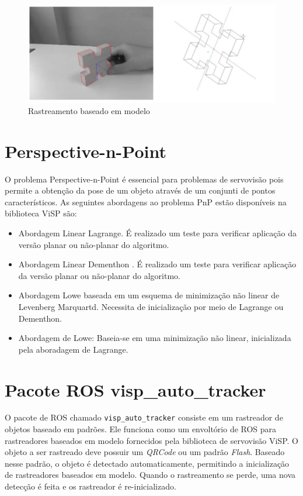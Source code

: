 \begin{figure}[!ht]
\centering
  \includegraphics[width=\linewidth]{./img/visp.png}
  \caption{Rastreamento baseado em modelo}
  \label{fig:cenpes_doris}
\end{figure}%

\section{Perspective-n-Point}
O problema Perspective-n-Point é essencial para problemas de servovisão pois permite a obtenção da pose de um objeto através de um conjunti de pontos característicos.  As seguintes abordagens ao problema PnP estão disponíveis na biblioteca ViSP são:
\begin{itemize}
\item Abordagem Linear Lagrange. É realizado um teste para verificar aplicação da versão planar ou não-planar do algoritmo. 

\item Abordagem Linear Dementhon \citep{dementhon1995model, oberkampf1996iterative}.  É realizado um teste para verificar aplicação da versão planar ou não-planar do algoritmo. 
	
\item Abordagem Lowe baseada em um esquema de minimização não linear de Levenberg Marquartd. Necessita de inicialização por meio de Lagrange ou Dementhon.

\item  Abordagem de Lowe: Baseia-se em uma minimização não linear, inicializada pela aboradagem de Lagrange.
\end{itemize}

\section{Pacote ROS visp\_auto\_tracker}
O pacote de ROS chamado \verb|visp_auto_tracker| consiste em um rastreador de objetos baseado em padrões. Ele funciona como um envoltório de ROS para rastreadores baseados em modelo fornecidos pela biblioteca de servovisão ViSP. O objeto a ser rastreado deve possuir um \textit{QRCode} ou um padrão \textit{Flash}. Baseado nesse padrão, o objeto é detectado automaticamente, permitindo a inicialização de rastreadores baseados em modelo. Quando o rastreamento se perde, uma nova detecção é feita e os rastreador é re-inicializado.

